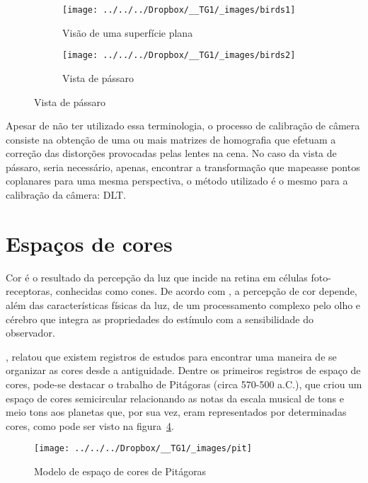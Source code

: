 \documentclass[ecp,tc]{iiufrgs}
\begin{document}
\begin{figure}
	\centering
	\caption{Vista de pássaro (\textit{bird's eye view})}
	\begin{subfigure}[b]{0.47\textwidth}
		\texttt{[image: ../../../Dropbox/\_\_TG1/\_images/birds1]}
		\caption{Visão de uma superfície plana}
		\label{fig:birds1}
	\end{subfigure}
	\quad
	\begin{subfigure}[b]{0.4\textwidth}
		\texttt{[image: ../../../Dropbox/\_\_TG1/\_images/birds2]}
		\caption{Vista de pássaro}
		\label{fig:birds2}
	\end{subfigure}
	\label{fig:image7}
\end{figure}


Apesar de não ter utilizado essa terminologia, o processo de calibração de câmera consiste na obtenção de uma ou mais matrizes de homografia que efetuam a correção das distorções provocadas pelas lentes na cena. No caso da vista de pássaro, seria necessário, apenas, encontrar a transformação que mapeasse pontos coplanares para uma mesma perspectiva, o método utilizado é o mesmo para a calibração da câmera: DLT.


\section{Espaços de cores}

Cor é o resultado da percepção da luz que incide na retina em células foto-receptoras, conhecidas como cones. De acordo com , a percepção de cor depende, além das características físicas da luz, de um processamento complexo pelo olho e cérebro que integra as propriedades do estímulo com a sensibilidade do observador.

, relatou que existem registros de estudos para encontrar uma maneira de se organizar as cores desde a antiguidade. Dentre os primeiros registros de espaço de cores, pode-se destacar  o trabalho de Pitágoras (circa 570-500 a.C.), que criou um espaço de cores semicircular relacionando as notas da escala musical de tons e meio tons aos planetas que, por sua vez, eram representados por determinadas cores, como pode ser visto na figura~\ref{fig:pit}.

\begin{figure}
	\centering
	\caption{Modelo de espaço de cores de Pitágoras}
	\texttt{[image: ../../../Dropbox/\_\_TG1/\_images/pit]}
	\label{fig:pit}
\end{figure}
\end{document}
